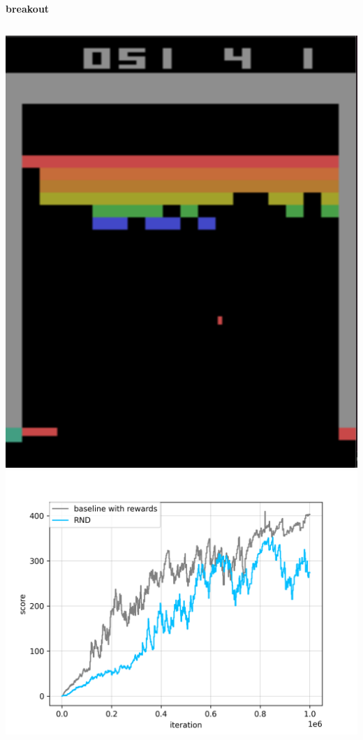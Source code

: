\documentclass[xcolor=dvipsnames]{beamer}
\begin{document}
\begin{frame}{\bf breakout}

  \begin{columns}

      \begin{column}{0.5\textwidth}
        \includegraphics[scale=0.25]{../images/breakout.png}
        \includegraphics[scale=0.3]{../results/breakout_score_per_iteration.png}
      \end{column}


\end{columns}
\end{frame}
\end{document}
